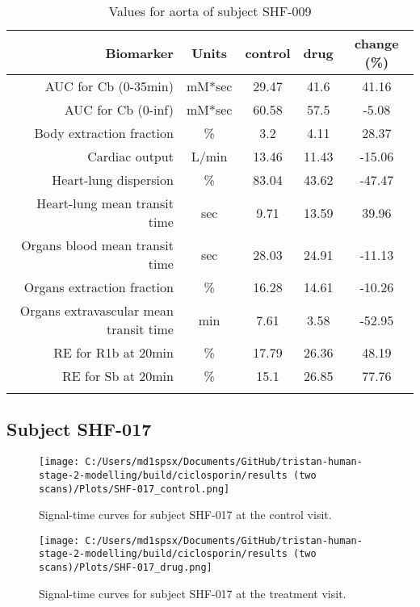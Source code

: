 \documentclass{epflreport}%
\begin{document}
\begin{longtable}{rcccc}%
\hline%
Biomarker&Units&control&drug&change (\%)\\%
\hline%
AUC for Cb (0{-}35min)&mM*sec&29.47&41.6&41.16\\%
AUC for Cb (0{-}inf)&mM*sec&60.58&57.5&{-}5.08\\%
Body extraction fraction&\%&3.2&4.11&28.37\\%
Cardiac output&L/min&13.46&11.43&{-}15.06\\%
Heart{-}lung dispersion&\%&83.04&43.62&{-}47.47\\%
Heart{-}lung mean transit time&sec&9.71&13.59&39.96\\%
Organs blood mean transit time&sec&28.03&24.91&{-}11.13\\%
Organs extraction fraction&\%&16.28&14.61&{-}10.26\\%
Organs extravascular mean transit time&min&7.61&3.58&{-}52.95\\%
RE for R1b at 20min&\%&17.79&26.36&48.19\\%
RE for Sb at 20min&\%&15.1&26.85&77.76\\%
\hline%
\caption{Values for aorta of subject SHF-009} \\%
\end{longtable}%
\clearpage%
\subsection{Subject SHF{-}017}%
\label{subsec:SubjectSHF{-}017}%

%


\begin{figure}[h!]%
\centering%
\texttt{[image: C:/Users/md1spsx/Documents/GitHub/tristan-human-stage-2-modelling/build/ciclosporin/results (two scans)/Plots/SHF-017\_control.png]}%
\caption{Signal{-}time curves for subject SHF{-}017 at the control visit.}%
\end{figure}

%


\begin{figure}[h!]%
\centering%
\texttt{[image: C:/Users/md1spsx/Documents/GitHub/tristan-human-stage-2-modelling/build/ciclosporin/results (two scans)/Plots/SHF-017\_drug.png]}%
\caption{Signal{-}time curves for subject SHF{-}017 at the treatment visit.}%
\end{figure}
\end{document}
